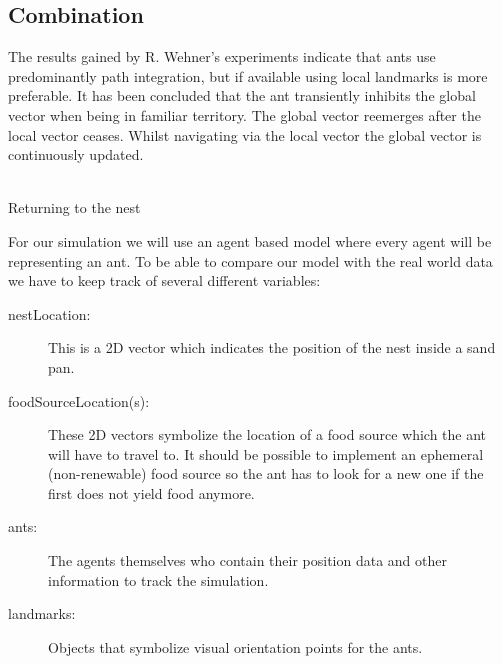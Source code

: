 \documentclass[11pt]{article}
\begin{document}
\subsection{Combination} \label{Sec:Combination}
The results gained by R. Wehner's experiments indicate that ants use predominantly path integration, but if available using local landmarks is more preferable. It has been concluded that the ant transiently inhibits the global vector when being in familiar territory. The global vector reemerges after the local vector ceases. Whilst navigating via the local vector the global vector is continuously updated.
\\ \

\begin{algorithm}[H]

\caption{Returning to the nest}
\end{algorithm}







\newpage

For our simulation we will use an agent based model where every agent will be representing an ant. To be able to compare our model with the real world data we have to keep track of several different variables:
\begin{description}
\item[nestLocation:] This is a 2D vector which indicates the position of the nest inside a sand pan.
\item[foodSourceLocation(s): ]These 2D vectors symbolize the location of a food source which the ant will have to travel to. It should be possible to implement an ephemeral (non-renewable) food source so the ant has to look for a new one if the first does not yield food anymore.
\item [ants: ]The agents themselves who contain their position data and other information to track the simulation.
\item[landmarks:]Objects that symbolize visual orientation points for the ants.
\end{description}
\end{document}
